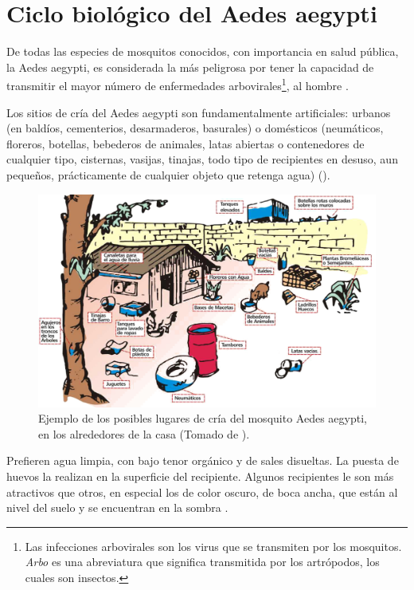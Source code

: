 
\section{Ciclo biológico del Aedes aegypti}
\label{sec:caracteristicas-biologicas}
De todas las especies de mosquitos conocidos, con importancia en salud pública, la Aedes aegypti,
es considerada la más peligrosa por tener la capacidad de transmitir el mayor número de enfermedades arbovirales\footnote{Las infecciones arbovirales son los virus que se transmiten por
los mosquitos. \textit{Arbo} es una abreviatura que significa transmitida por los artrópodos, los
cuales son insectos.}, al hombre \cite{ThironIzcazaJ2003}.

Los sitios de cría del Aedes aegypti son fundamentalmente artificiales: urbanos (en baldíos,
cementerios, desarmaderos, basurales) o domésticos (neumáticos, floreros, botellas, bebederos de
animales, latas abiertas o contenedores de cualquier tipo, cisternas, vasijas, tinajas, todo tipo
de recipientes en desuso, aun pequeños, prácticamente de cualquier objeto que retenga agua)
\cite{world2009dengue, directricesDetvArg} ().

\begin{figure}[!htbp]
\centering
\includegraphics[width=\textwidth]{capitulo-3/graphics/criaderos-domicilio.png}
\caption{\label{fig:lugares-criaderos} Ejemplo de los posibles lugares de cría del mosquito Aedes
aegypti, en los alrededores de la casa (Tomado de \cite{manualControlArg2009}).}
\end{figure}

Prefieren agua limpia, con bajo tenor orgánico y de sales disueltas. La puesta de huevos la
realizan en la superficie del recipiente. Algunos recipientes le son más atractivos que otros, en
especial los de color oscuro, de boca ancha, que están al nivel del suelo y se encuentran en la
sombra \cite{ThironIzcazaJ2003}.


